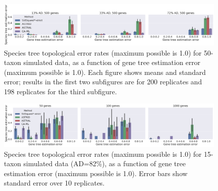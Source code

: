 \begin{figure}
  \centering
  \includegraphics[width=\textwidth]{svdquest-figs/concat_rfdists_500.pdf}
\caption[Species tree topological error rates for 50-taxon simulated data as a function of gene tree estimation error]{Species tree topological error rates (maximum possible is 1.0) for 50-taxon simulated data, as a function of
    gene tree estimation error (maximum possible is 1.0).
    {Each figure shows means and standard
    error; results in the first two subfigures are for 200 replicates  and 198 replicates for the third subfigure.} }
\label{svdquest::fig:exp3_50}\end{figure}


\begin{figure}
  \centering
  \includegraphics[width=\textwidth]{svdquest-figs/concat_rfdists_15tax.pdf}
\caption[Species tree topological error rates for 15-taxon simulated data as a function of gene tree estimation error]{Species tree topological  error rates (maximum possible is 1.0) 
  for 15-taxon simulated data (AD=82\%), as a
    function of gene tree estimation error (maximum possible is 1.0). Error bars show standard
    error over 10 replicates.
      }
\label{svdquest::fig:exp3_15}\end{figure}


